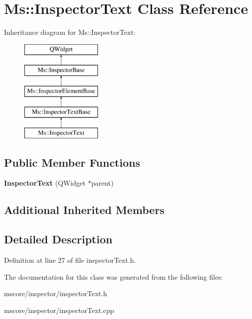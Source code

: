 \hypertarget{class_ms_1_1_inspector_text}{}\section{Ms\+:\+:Inspector\+Text Class Reference}
\label{class_ms_1_1_inspector_text}
Inheritance diagram for Ms\+:\+:Inspector\+Text\+:\begin{figure}[H]
\begin{center}
\leavevmode
\includegraphics[height=5.000000cm]{class_ms_1_1_inspector_text}
\end{center}
\end{figure}
\subsection*{Public Member Functions}
\begin{DoxyCompactItemize}
\item 
\mbox{\label{class_ms_1_1_inspector_text_a78cb7391c634278707e215482a9a8f9f}} 
{\bfseries Inspector\+Text} (Q\+Widget $\ast$parent)
\end{DoxyCompactItemize}
\subsection*{Additional Inherited Members}


\subsection{Detailed Description}


Definition at line 27 of file inspector\+Text.\+h.



The documentation for this class was generated from the following files\+:\begin{DoxyCompactItemize}
\item 
mscore/inspector/inspector\+Text.\+h\item 
mscore/inspector/inspector\+Text.\+cpp\end{DoxyCompactItemize}
